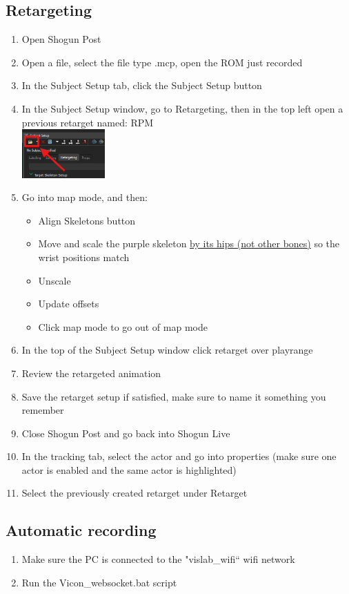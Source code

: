\subsection{Retargeting}
\begin{enumerate}
    \item Open Shogun Post
    \item Open a file, select the file type .mcp, open the ROM just recorded
    \item In the Subject Setup tab, click the Subject Setup button
    \item In the Subject Setup window, go to Retargeting, then in the top left open a previous retarget named: RPM\\
    \includegraphics[width=0.25\textwidth]{imgs/openTake.png}
    \item Go into map mode, and then:
    \begin{itemize}
        \item Align Skeletons button
        \item Move and scale the purple skeleton \underline{by its hips (not other bones)} so the wrist positions match
        \item Unscale
        \item Update offsets
        \item Click map mode to go out of map mode
    \end{itemize}
    \item In the top of the Subject Setup window click retarget over playrange
    \item Review the retargeted animation
    \item Save the retarget setup if satisfied, make sure to name it something you remember
    \item Close Shogun Post and go back into Shogun Live
    \item In the tracking tab, select the actor and go into properties (make sure one actor is enabled and the same actor is highlighted)
    \item Select the previously created retarget under Retarget
\end{enumerate}

\subsection{Automatic recording}
\begin{enumerate}
    \item Make sure the PC is connected to the "vislab\_wifi`` wifi network
    \item Run the Vicon\_websocket.bat script
\end{enumerate}